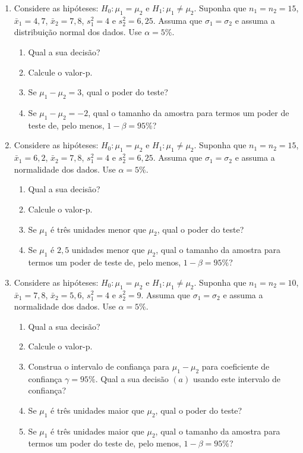 \documentclass[8pt, a4paper]{article}
\begin{document}
\begin{enumerate}
	\item Considere as hipóteses: $H_0: \mu_1 = \mu_2$ e $H_1: \mu_1 \neq \mu_2$. Suponha que $n_1=n_2=15$, $\bar{x}_1 = 4,7$, $\bar{x}_2=7,8$, $s_1^2=4$ e $s_2^2=6,25$. Assuma que $\sigma_1 = \sigma_2$ e assuma a distribuição normal dos dados. Use $\alpha = 5\%$.
	\begin{enumerate}
		\item Qual a sua decisão?
		\item Calcule o valor-p.
		\item Se $\mu_1 - \mu_2 = 3$, qual o poder do teste?
		\item Se $\mu_1 - \mu_2 = -2$, qual o tamanho da amostra para termos um poder de teste de, pelo menos, $1-\beta = 95\%$?
	\end{enumerate}

	\item Considere as hipóteses: $H_0:\mu_1 = \mu_2$ e $H_1: \mu_1 \neq \mu_2$. Suponha que $n_1=n_2=15$, $\bar{x}_1=6,2$, $\bar{x}_2 = 7,8$, $s_1^2 = 4$ e $s_2^2 = 6,25$. Assuma que $\sigma_1 = \sigma_2$ e assuma a normalidade dos dados. Use $\alpha = 5\%$.
	\begin{enumerate}
		\item Qual a sua decisão?
		\item Calcule o valor-p.
		\item Se $\mu_1$ é três unidades menor que $\mu_2$, qual o poder do teste?
		\item Se $\mu_1$ é $2,5$ unidades menor que $\mu_2$, qual o tamanho da amostra para termos um poder de teste de, pelo menos, $1-\beta=95\%$?
	\end{enumerate}

	\item Considere as hipóteses: $H_0: \mu_1 = \mu_2$ e $H_1: \mu_1 \neq \mu_2$. Suponha que $n_1=n_2=10$, $\bar{x}_1=7,8$, $\bar{x}_2=5,6$, $s_1^2 = 4$ e $s_2^2 = 9$. Assuma que $\sigma_1 = \sigma_2$ e assuma a normalidade dos dados. Use $\alpha=5\%$.
	\begin{enumerate}
		\item Qual a sua decisão?
		\item Calcule o valor-p.
		\item Construa o intervalo de confiança para $\mu_1 - \mu_2$ para coeficiente de confiança $\gamma=95\%$. Qual a sua decisão $(a)$ usando este intervalo de confiança?
		\item Se $\mu_1$ é três unidades maior que $\mu_2$, qual o poder do teste?
		\item Se $\mu_1$ é três unidades maior que $\mu_2$, qual o tamanho da amostra para termos um poder do teste de, pelo menos, $1-\beta = 95\%$?
	\end{enumerate}


\end{enumerate}
\end{document}
